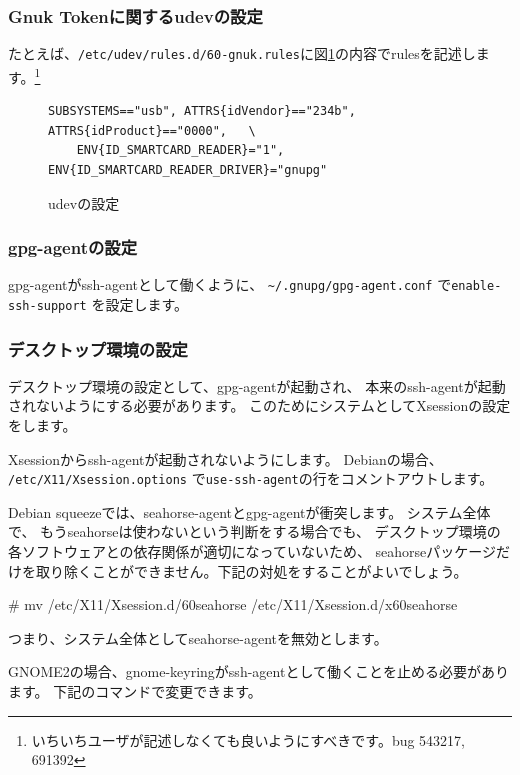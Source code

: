 \documentclass[mingoth,a4paper,twoside]{jsarticle}
\begin{document}
\iffalse
\subsubsection{Gnuk Tokenに関するudevの設定}
たとえば、\verb|/etc/udev/rules.d/60-gnuk.rules|に図\ref{fig:gnuk-udev}の内容でrulesを記述します。\footnote{いちいちユーザが記述しなくても良いようにすべきです。bug 543217, 691392}

\begin{figure}[h]
\centering
\begin{Verbatim}[frame=single]
    SUBSYSTEMS=="usb", ATTRS{idVendor}=="234b", ATTRS{idProduct}=="0000",   \
    ENV{ID_SMARTCARD_READER}="1", ENV{ID_SMARTCARD_READER_DRIVER}="gnupg"
\end{Verbatim}
\caption{udevの設定}\label{fig:gnuk-udev}
\end{figure}

\subsubsection{gpg-agentの設定}

gpg-agentがssh-agentとして働くように、 \verb|~/.gnupg/gpg-agent.conf|
で\verb|enable-ssh-support| を設定します。

\subsubsection{デスクトップ環境の設定}
デスクトップ環境の設定として、gpg-agentが起動され、
本来のssh-agentが起動されないようにする必要があります。
このためにシステムとしてXsessionの設定をします。

Xsessionからssh-agentが起動されないようにします。
Debianの場合、
\verb|/etc/X11/Xsession.options|
で\verb|use-ssh-agent|の行をコメントアウトします。

Debian squeezeでは、seahorse-agentとgpg-agentが衝突します。
システム全体で、 もうseahorseは使わないという判断をする場合でも、
デスクトップ環境の各ソフトウェアとの依存関係が適切になっていないため、
seahorseパッケージだけを取り除くことができません。下記の対処をすることがよいでしょう。

\begin{commandline}
  # mv /etc/X11/Xsession.d/60seahorse /etc/X11/Xsession.d/x60seahorse
\end{commandline}

つまり、システム全体としてseahorse-agentを無効とします。

GNOME2の場合、gnome-keyringがssh-agentとして働くことを止める必要があります。
下記のコマンドで変更できます。
\end{document}
